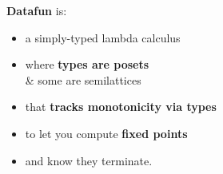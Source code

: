 \documentclass{beamer}
\newcommand{\m}[1]{\ensuremath{\mathbf{#1}}}
\newcommand{\ms}{\mathsf}
\begin{document}

\begin{frame}

  \Large \textbf{Datafun} is:
  \begin{itemize}
  \item a simply-typed lambda calculus
  \item where \textbf{types are posets}\\{\& some are semilattices}
  \item that \textbf{tracks monotonicity via types}
  \item to let you compute \textbf{fixed points}
  \item and know they terminate.
  \end{itemize}
\end{frame}







\end{document}

